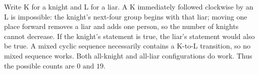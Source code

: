 Write K for a knight and L for a liar. A K immediately followed clockwise by an L is impossible: the knight's next-four group begins with that liar; moving one place forward removes a liar and adds one person, so the number of knights cannot decrease. If the knight's statement is true, the liar's statement would also be true. A mixed cyclic sequence necessarily contains a K-to-L transition, so no mixed sequence works. Both all-knight and all-liar configurations do work. Thus the possible counts are $\boxed{0\text{ and }19}$.
